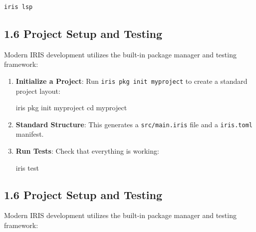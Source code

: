 \documentclass[
  english,
]{book}
\newenvironment{Shaded}{\begin{snugshade}}{\end{snugshade}}
\newcommand{\BuiltInTok}[1]{\textcolor[rgb]{0.83,0.83,0.83}{#1}}
\newcommand{\ExtensionTok}[1]{\textcolor[rgb]{0.83,0.83,0.83}{#1}}
\newcommand{\NormalTok}[1]{\textcolor[rgb]{0.83,0.83,0.83}{#1}}
\begin{document}
\begin{verbatim}
iris lsp
\end{verbatim}

\subsection{1.6 Project Setup and
Testing}\label{project-setup-and-testing}

Modern IRIS development utilizes the built-in package manager and
testing framework:

\begin{enumerate}
\def\labelenumi{\arabic{enumi}.}
\item
  \textbf{Initialize a Project}: Run \texttt{iris\ pkg\ init\ myproject}
  to create a standard project layout:

\begin{Shaded}
\begin{Highlighting}[]
\ExtensionTok{iris}\NormalTok{ pkg init myproject}
\BuiltInTok{cd}\NormalTok{ myproject}
\end{Highlighting}
\end{Shaded}
\item
  \textbf{Standard Structure}: This generates a \texttt{src/main.iris}
  file and a \texttt{iris.toml} manifest.
\item
  \textbf{Run Tests}: Check that everything is working:

\begin{Shaded}
\begin{Highlighting}[]
\ExtensionTok{iris}\NormalTok{ test}
\end{Highlighting}
\end{Shaded}
\end{enumerate}

\subsection{1.6 Project Setup and
Testing}\label{project-setup-and-testing-1}

Modern IRIS development utilizes the built-in package manager and
testing framework:
\end{document}
